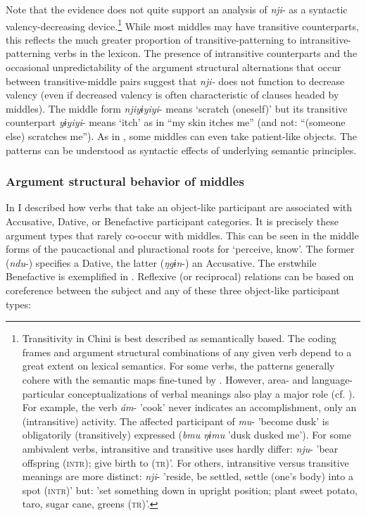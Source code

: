 \documentclass[output=paper]{langscibook}
\begin{document}
Note that the evidence does not quite support an analysis of \textit{nji}- as a syntactic valency-decreasing device.\footnote{Transitivity in Chini is best described as semantically based. The coding frames and argument structural combinations of any given verb depend to a great extent on lexical semantics. For some verbs, the patterns generally cohere with the semantic maps fine-tuned by \citet{ComrieEtAl2015}. However, area- and language-particular conceptualizations of verbal meanings also play a major role (cf. \citealt{Pawley2000}). For example, the verb \textit{ám}- 'cook' never indicates an accomplishment, only an (intransitive) activity. The affected participant of \textit{mu}- 'become dusk' is obligatorily (transitively) expressed (\textit{bmu ŋɨmu} 'dusk dusked me'). For some ambivalent verbs, intransitive and transitive uses hardly differ: \textit{nju}- 'bear offspring (\textsc{intr}); give birth to (\textsc{tr})'. For others, intransitive versus transitive meanings are more distinct: \textit{nji}- 'reside, be settled, settle (one's body) into a spot (\textsc{intr})' but: 'set something down in upright position; plant sweet potato, taro, sugar cane, greens (\textsc{tr})'.} While most middles may have transitive counterparts, this reflects the much greater proportion of transitive-patterning to intransitive-patterning verbs in the lexicon. The presence of intransitive counterparts and the occasional unpredictability of the argument structural alternations that occur between transitive-middle pairs suggest that \textit{nji-} does not function to decrease valency (even if decreased valency is often characteristic of clauses headed by middles). The middle form \textit{njiyɨyiyi}- means ‘scratch (oneself)’ but its transitive counterpart \textit{yɨyiyi}- means ‘itch’ as in “my skin itches me” (and not: “(someone else) scratches me”). As in , some middles can even take patient-like objects. The patterns can be understood as syntactic effects of underlying semantic principles.

\subsubsection{{Argument} {structural} {behavior} {of} {middles}}\label{sec:brooks:4.1.1}

In  I described how verbs that take an object-like participant are associated with Accusative, Dative, or Benefactive participant categories. It is precisely these argument types that rarely co-occur with middles. This can be seen in the middle forms of the paucactional  and pluractional  roots for ‘perceive, know’. The former (\textit{ndu}-) specifies a Dative, the latter (\textit{ŋgɨn}-) an Accusative. The erstwhile Benefactive is exemplified in . Reflexive (or reciprocal) relations can be based on coreference between the subject and any of these three object-like participant types:
\end{document}
